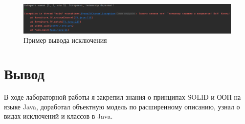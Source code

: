 \documentclass[12pt]{article}
\begin{document}
\begin{figure}[h]
    \centering
    \includegraphics[width=\linewidth]{image7.png}
    \caption{Пример вывода исключения}
\end{figure}
\newpage

\section{Вывод}

В ходе лабораторной работы я закрепил знания о принципах SOLID и ООП на языке Java, доработал объектную модель по расширенному описанию, узнал о видах исключений и классов в Java.
\end{document}

